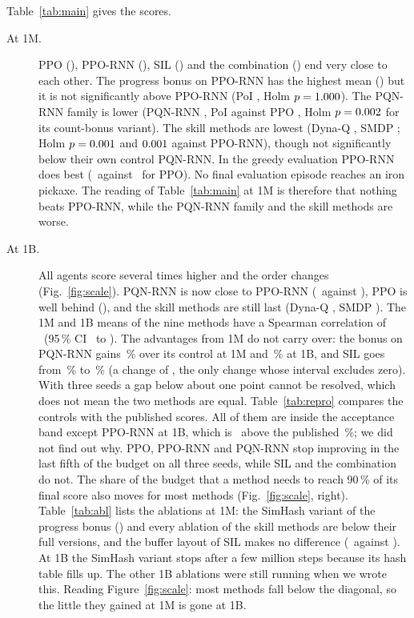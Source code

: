 \documentclass[cameraready]{Interspeech}
\begin{document}
Table~\ref{tab:main} gives the scores.
\begin{description}
\item[At 1M.] PPO (\scoreOneMPpo), PPO-RNN (\scoreOneMPpoRnn), SIL (\scoreOneMSil) and the combination (\scoreOneMCombo) end very close to each other. The progress bonus on PPO-RNN has the highest mean (\scoreOneMCountBonusPpoRnn) but it is not significantly above PPO-RNN (PoI \poiOneMCountBonusPpoRnnPpoRnn, Holm $p=1.000$). The PQN-RNN family is lower (PQN-RNN \scoreOneMPqnRnn, PoI against PPO \poiOneMPqnRnnPpo, Holm $p=0.002$ for its count-bonus variant). The skill methods are lowest (Dyna-Q \scoreOneMDynaQ, SMDP \scoreOneMSmdpSkills; Holm $p=0.001$ and $0.001$ against PPO-RNN), though not significantly below their own control PQN-RNN. In the greedy evaluation PPO-RNN does best (\evalGreedyOneMPpoRnn\ against \evalGreedyOneMPpo\ for PPO). No final evaluation episode reaches an iron pickaxe. The reading of Table~\ref{tab:main} at 1M is therefore that nothing beats PPO-RNN, while the PQN-RNN family and the skill methods are worse.
\item[At 1B.] All agents score several times higher and the order changes (Fig.~\ref{fig:scale}). PQN-RNN is now close to PPO-RNN (\scoreOneBPqnRnn\ against \scoreOneBPpoRnn), PPO is well behind (\scoreOneBPpo), and the skill methods are still last (Dyna-Q \scoreOneBDynaQ, SMDP \scoreOneBSmdpSkills). The 1M and 1B means of the nine methods have a Spearman correlation of \scaleSpearman\ (95\,\% CI \scaleSpearmanLo\ to \scaleSpearmanHi). The advantages from 1M do not carry over: the bonus on PQN-RNN gains \scaleGainOneMCountBonusPqnRnn\,\% over its control at 1M and \scaleGainOneBCountBonusPqnRnn\,\% at 1B, and SIL goes from \scaleGainOneMSil\,\% to \scaleGainOneBSil\,\% (a change of \scaleChangeSil, the only change whose interval excludes zero). With three seeds a gap below about one point cannot be resolved, which does not mean the two methods are equal. Table~\ref{tab:repro} compares the controls with the published scores. All of them are inside the acceptance band except PPO-RNN at 1B, which is \gateGapOneBPpoRnn\ above the published \gatePubOneBPpoRnn\,\%; we did not find out why. PPO, PPO-RNN and PQN-RNN stop improving in the last fifth of the budget on all three seeds, while SIL and the combination do not. The share of the budget that a method needs to reach 90\,\% of its final score also moves for most methods (Fig.~\ref{fig:scale}, right). Table~\ref{tab:abl} lists the ablations at 1M: the SimHash variant of the progress bonus (\scoreOneMCountBonusPpoRnnSimHash) and every ablation of the skill methods are below their full versions, and the buffer layout of SIL makes no difference (\scoreOneMSilSingleBuffer\ against \scoreOneMSil). At 1B the SimHash variant stops after a few million steps because its hash table fills up. The other 1B ablations were still running when we wrote this. Reading Figure~\ref{fig:scale}: most methods fall below the diagonal, so the little they gained at 1M is gone at 1B.
\end{description}
\end{document}
